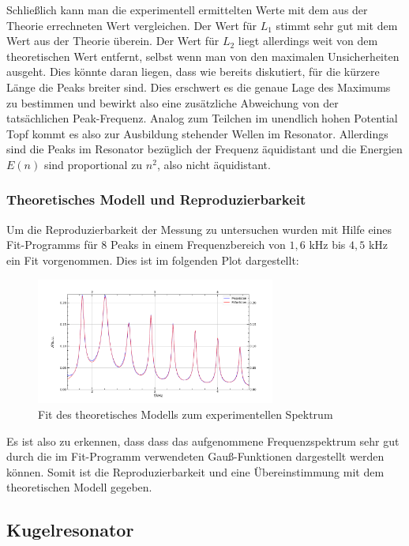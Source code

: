 \documentclass[german,  %
parskip=full,  %
]{scrartcl}
\begin{document}
Schließlich kann man die experimentell ermittelten Werte mit dem aus der Theorie errechneten Wert vergleichen. Der Wert für $L_1$ stimmt sehr gut mit dem Wert aus der Theorie überein. Der Wert für $L_2$ liegt allerdings weit von dem theoretischen Wert entfernt, selbst wenn man von den maximalen Unsicherheiten ausgeht. Dies könnte daran liegen, dass wie bereits diskutiert, für die kürzere Länge die Peaks breiter sind. Dies erschwert es die genaue Lage des Maximums zu bestimmen und bewirkt also eine zusätzliche Abweichung von der tatsächlichen Peak-Frequenz.
\newline
\newline Analog zum Teilchen im unendlich hohen Potential Topf kommt es also zur Ausbildung stehender Wellen im Resonator. Allerdings sind die Peaks im Resonator bezüglich der Frequenz äquidistant und die Energien $E(n)$ sind proportional zu $n^2$, also nicht äquidistant.

\subsubsection{Theoretisches Modell und Reproduzierbarkeit}
Um die Reproduzierbarkeit der Messung zu untersuchen wurden mit Hilfe eines Fit-Programms für 8 Peaks in einem Frequenzbereich von $1,6$ kHz bis $4,5$ kHz ein Fit vorgenommen. Dies ist im folgenden Plot dargestellt:
\begin{figure}[h!]
\centering
\includegraphics[width=0.7\textwidth]{Messung_L2_und_Fitfunktion.png}
\caption{Fit des theoretisches Modells zum experimentellen Spektrum}
\end{figure}
\newpage
Es ist also zu erkennen, dass dass das aufgenommene Frequenzspektrum sehr gut durch die im Fit-Programm verwendeten Gauß-Funktionen dargestellt werden können.
Somit ist die Reproduzierbarkeit und eine Übereinstimmung mit dem theoretischen Modell gegeben.

\subsection{Kugelresonator}
\end{document}
